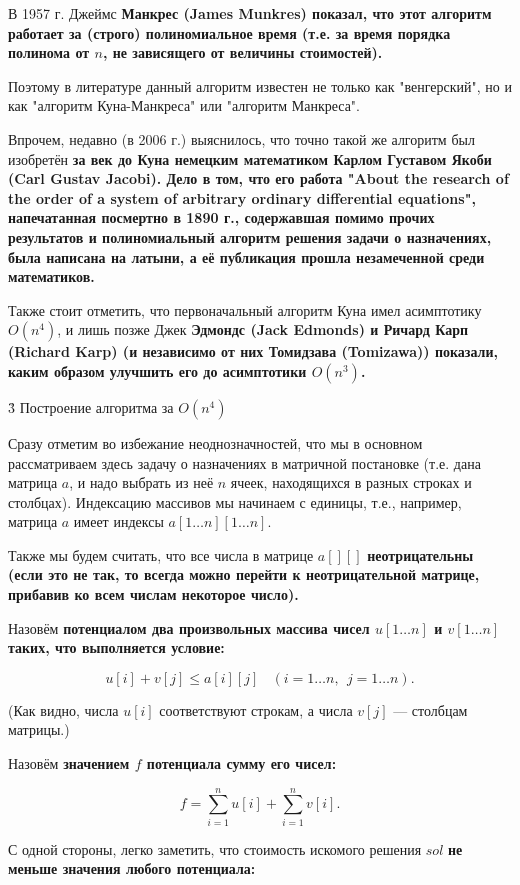 В 1957 г. Джеймс \bf{Манкрес} (James Munkres) показал, что этот алгоритм работает за (строго) полиномиальное время (т.е. за время порядка полинома от $n$, не зависящего от величины стоимостей).

Поэтому в литературе данный алгоритм известен не только как "венгерский", но и как "алгоритм Куна-Манкреса" или "алгоритм Манкреса".

Впрочем, недавно (в 2006 г.) выяснилось, что точно такой же алгоритм был изобретён \bf{за век до Куна} немецким математиком Карлом Густавом \bf{Якоби} (Carl Gustav Jacobi). Дело в том, что его работа "About the research of the order of a system of arbitrary ordinary differential equations", напечатанная посмертно в 1890 г., содержавшая помимо прочих результатов и полиномиальный алгоритм решения задачи о назначениях, была написана на латыни, а её публикация \bf{прошла незамеченной} среди математиков.

Также стоит отметить, что первоначальный алгоритм Куна имел асимптотику $O(n^4)$, и лишь позже Джек \bf{Эдмондс} (Jack Edmonds) и Ричард \bf{Карп} (Richard Karp) (и независимо от них \bf{Томидзава} (Tomizawa)) показали, каким образом улучшить его до асимптотики $O(n^3)$.


\h3{ Построение алгоритма за $O(n^4)$ }

Сразу отметим во избежание неоднозначностей, что мы в основном рассматриваем здесь задачу о назначениях в матричной постановке (т.е. дана матрица $a$, и надо выбрать из неё $n$ ячеек, находящихся в разных строках и столбцах). Индексацию массивов мы начинаем с единицы, т.е., например, матрица $a$ имеет индексы $a[1 \ldots n][1 \ldots n]$.

Также мы будем считать, что все числа в матрице $a[][]$ \bf{неотрицательны} (если это не так, то всегда можно перейти к неотрицательной матрице, прибавив ко всем числам некоторое число).

Назовём \bf{потенциалом} два произвольных массива чисел $u[1 \ldots n]$ и $v[1 \ldots n]$ таких, что выполняется условие:

$$ u[i] + v[j] \le a[i][j] ~~~~ (i = 1 \ldots n, ~~ j = 1 \ldots n). $$

(Как видно, числа $u[i]$ соответствуют строкам, а числа $v[j]$ --- столбцам матрицы.)

Назовём \bf{значением $f$ потенциала} сумму его чисел:

$$ f = \sum_{i=1}^n u[i] + \sum_{i=1}^n v[i]. $$

С одной стороны, легко заметить, что стоимость искомого решения $sol$ \bf{не меньше} значения любого потенциала:

